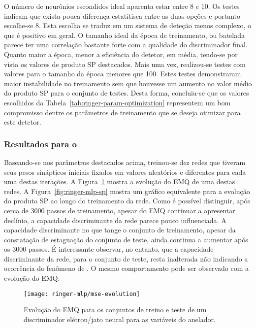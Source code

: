 O número de neurônios escondidos ideal aparenta estar entre 8 e 10. Os testes
indicam que exista pouca diferença estatítisca entre as duas opções e portanto
escolhe-se 8. Esta escolha se traduz em um sistema de deteção menos complexo,
o que é positivo em geral. O tamanho ideal da época de treinamento, ou
batelada parece ter uma correlação bastante forte com a qualidade do
discriminador final. Quanto maior a época, menor a eficiência do detetor, em
média, tendo-se por vista os valores de produto SP destacados. Mais uma vez,
realizou-se testes com valores para o tamanho da época menores que 100. Estes
testes demonstraram maior instabilidade no treinamento sem que houvesse um
aumento no valor médio do produto SP para o conjunto de testes. Desta forma,
concluiu-se que os valores escolhidos da
Tabela~\ref{tab:ringer-param-optimization} representem um bom compromisso 
dentre os parâmetros de treinamento que se deseja otimizar para este detetor.

\subsubsection{Resultados para o }

Baseando-se nos parâmetros destacados acima, treinou-se dez redes que tiveram
seus pesos sinápticos iniciais fixados em valores aleatórios e diferentes para
cada uma destas iterações. A Figura~\ref{fig:ringer-mlp-mse} mostra a evolução
do EMQ de uma destas redes. A Figura~\ref{fig:ringer-mlp-sp} mostra um gráfico
equivalente para a evolução do produto SP ao longo do treinamento da
rede. Como é possível distinguir, após cerca de 3000 passos de treinamento,
apesar do EMQ continuar a apresentar declínio, a capacidade discriminante da
rede parece pouco influenciada. A capacidade discriminante no que tange o
conjunto de treinamento, apesar da constatação de estagnação do conjunto de
teste, ainda continua a aumentar após os 3000 passos. É interessante observar,
no entanto, que a capacidade discriminante da rede, para o conjunto de teste,
resta inalterada não indicando a ocorrência do fenômeno de
. O mesmo comportamento pode ser observado com a evolução do
EMQ.

\begin{figure}
\begin{center}
\texttt{[image: ringer-mlp/mse-evolution]}
\end{center}
\caption{Evolução do EMQ para os conjuntos de treino e teste de um
discriminador elétron/jato neural para as variáveis do anelador.}
\label{fig:ringer-mlp-mse}
\end{figure}

